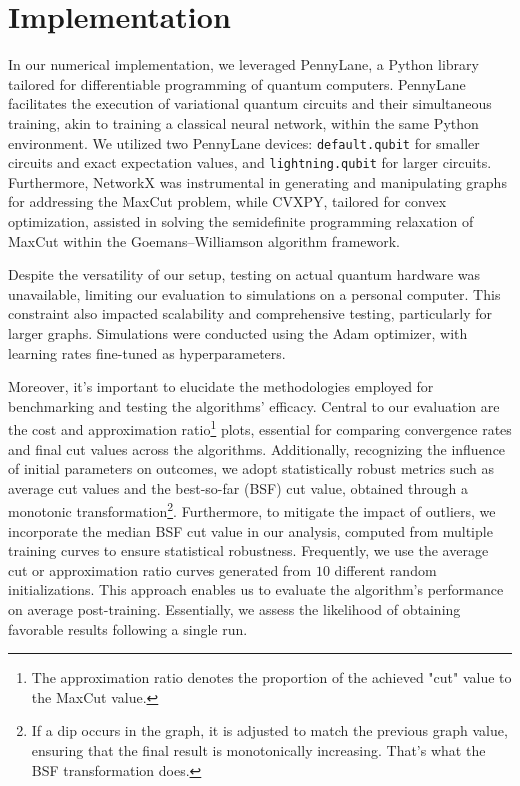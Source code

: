 \section{Implementation}
\label{sec:resul}

In our numerical implementation, we leveraged PennyLane, a Python library tailored for differentiable programming of quantum computers. PennyLane facilitates the execution of variational quantum circuits and their simultaneous training, akin to training a classical neural network, within the same Python environment. We utilized two PennyLane devices: \texttt{default.qubit} for smaller circuits and exact expectation values, and \texttt{lightning.qubit} for larger circuits. Furthermore, NetworkX was instrumental in generating and manipulating graphs for addressing the MaxCut problem, while CVXPY, tailored for convex optimization, assisted in solving the semidefinite programming relaxation of MaxCut within the Goemans–Williamson algorithm framework.

Despite the versatility of our setup, testing on actual quantum hardware was unavailable, limiting our evaluation to simulations on a personal computer. This constraint also impacted scalability and comprehensive testing, particularly for larger graphs. Simulations were conducted using the Adam optimizer, with learning rates fine-tuned as hyperparameters.

Moreover, it's important to elucidate the methodologies employed for benchmarking and testing the algorithms' efficacy. Central to our evaluation are the cost and approximation ratio\footnote{The approximation ratio denotes the proportion of the achieved "cut" value to the MaxCut value.} plots, essential for comparing convergence rates and final cut values across the algorithms. Additionally, recognizing the influence of initial parameters on outcomes, we adopt statistically robust metrics such as average cut values and the best-so-far (BSF) cut value, obtained through a monotonic transformation\footnote{If a dip occurs in the graph, it is adjusted to match the previous graph value, ensuring that the final result is monotonically increasing. That's what the BSF transformation does.}. Furthermore, to mitigate the impact of outliers, we incorporate the median BSF cut value in our analysis, computed from multiple training curves to ensure statistical robustness. Frequently, we use the average cut or approximation ratio curves generated from $10$ different random initializations. This approach enables us to evaluate the algorithm's performance on average post-training. Essentially, we assess the likelihood of obtaining favorable results following a single run.

